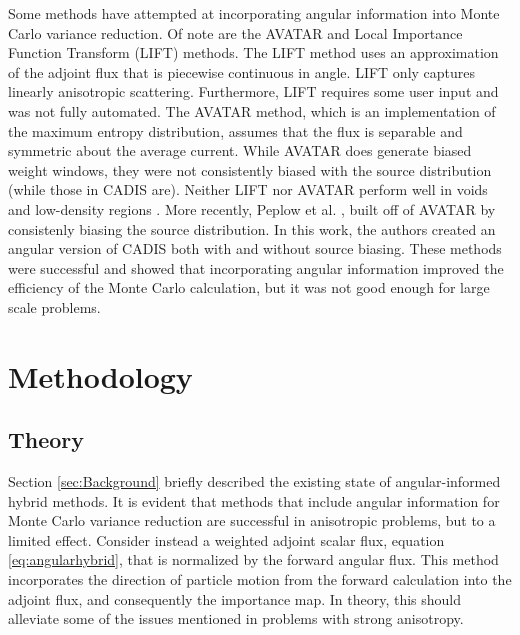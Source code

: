 \documentclass{mc2015}
\begin{document}
Some methods have attempted at incorporating angular information into Monte Carlo variance reduction. Of note are the AVATAR \cite{van_riper_avatarautomatic_1997} and Local Importance Function Transform (LIFT) \cite{turner_automatic_1997} methods. The LIFT method uses an approximation of the adjoint flux that is piecewise continuous in angle. LIFT only captures linearly anisotropic scattering. Furthermore, LIFT requires some user input and was not fully automated. The AVATAR method, which is an implementation of the maximum entropy distribution, assumes that the flux is separable and symmetric about the average current. While AVATAR does generate biased weight windows, they were not consistently biased with the source distribution (while those in CADIS are). Neither LIFT nor AVATAR perform well in voids and low-density regions \cite{turner_automatic_1997-1}. More recently, Peplow et al. \cite{Peplow-ORNL}, built off of AVATAR by consistenly biasing the source distribution. In this work, the authors created an angular version of CADIS both with and without source biasing. These methods were successful and showed that incorporating angular information improved the efficiency of the Monte Carlo calculation, but it was not good enough for large scale problems. %

\section{Methodology}
\label{sec:Methodology}

\subsection{Theory}
\label{sec:Theory}

Section \ref{sec:Background} briefly described the existing state of angular-informed hybrid methods. It is evident that methods that include angular information for Monte Carlo variance reduction are successful in anisotropic problems, but to a limited effect. 
Consider instead a weighted adjoint scalar flux, equation \ref{eq:angularhybrid}, that is normalized by the forward angular flux. This method incorporates the direction of particle motion from the forward calculation into the adjoint flux, and consequently the importance map. In theory, this should alleviate some of the issues mentioned in problems with strong anisotropy. 
\end{document}
